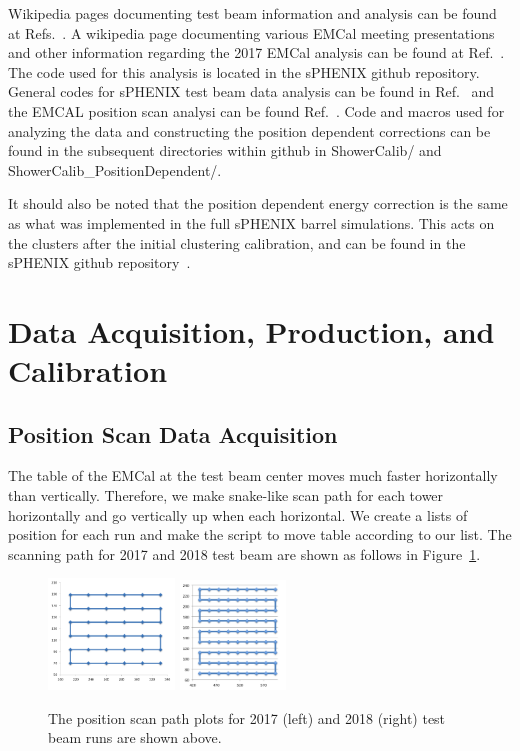 \documentclass[hidelinks,11pt]{article}
\numberwithin{figure}{section}
\numberwithin{table}{section}
\begin{document}
Wikipedia pages documenting test beam information and analysis can be found at Refs.~\cite{beamtestwiki}. A wikipedia page documenting various EMCal meeting presentations and other information regarding the 2017 EMCal analysis can be found at Ref.~\cite{EMCALMeetings}. The code used for this analysis is located in the sPHENIX github repository. General codes for sPHENIX test beam data analysis can be found in Ref.~\cite{sPHENIXgithub} and the EMCAL position scan analysi can be found  Ref.~\cite{MyCodesgithub}. Code and macros used for analyzing the data and constructing the position dependent corrections can be found in the subsequent directories within github in ShowerCalib/ and ShowerCalib\_PositionDependent/. 

\noindent It should also be noted that the position dependent energy correction is the same as what was implemented in the full sPHENIX barrel simulations. This acts on the clusters after the initial clustering calibration, and can be found in the sPHENIX github repository~\cite{sPHENIXgithub}. 

\section{Data Acquisition, Production, and Calibration}

\subsection{Position Scan Data Acquisition}

The table of the EMCal at the test beam center moves much faster horizontally than vertically. Therefore, we make snake-like scan path for each tower horizontally and go vertically up when each horizontal. We create a lists of position for each run and make the script to move table according to our list. The scanning path for 2017 and 2018 test beam are shown as follows in Figure~\ref{fig:scanpath}.

\begin{figure}[hbtp]
\begin{center}
\includegraphics[width=0.30\textwidth]{Plots/2017ScanPath.png}
\includegraphics[width=0.25\textwidth]{Plots/2018ScanPath.png}
\caption{The position scan path plots for 2017 (left) and 2018 (right) test beam runs are shown above.}
\label{fig:scanpath}
\end{center}
\end{figure} 
\end{document}
